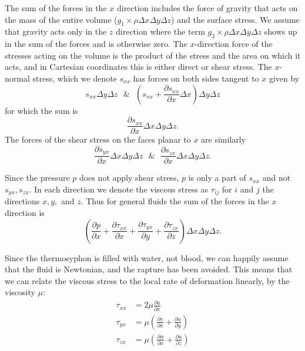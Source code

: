 The sum of the forces in the $x$ direction includes the force of gravity that acts on the mass of the entire volume ($g_1 \times \rho \Delta x\Delta y \Delta z$) and the surface stress.
We assume that gravity acts only in the $z$ direction where the term $g_3 \times \rho \Delta x \Delta y \Delta z$ shows up in the sum of the forces and is otherwise zero.
The $x$-direction force of the stresses acting on the volume is the product of the stress and the area on which it acts, and in Cartesian coordinates this is either direct or shear stress.
The $x$-normal stress, which we denote $s_{xx}$ has forces on both sides tangent to $x$ given by
\begin{equation*} s_{xx} \Delta y \Delta z ~~~\& ~~~ \left ( s_{xx} + \frac{\partial s_{xx} }{\partial x} \Delta x \right ) \Delta y \Delta z \end{equation*}
for which the sum is
\begin{equation*} \frac{\partial s_{xx} }{\partial x} \Delta x \Delta y \Delta z .\end{equation*}
The forces of the shear stress on the faces planar to $x$ are similarly
\begin{equation*} \frac{\partial s_{yx} }{\partial x} \Delta x \Delta y \Delta z ~~~\&~~~\frac{\partial s_{zx} }{\partial x} \Delta x \Delta y \Delta z .\end{equation*} 

Since the pressure $p$ does not apply shear stress, $p$ is only a part of $s_{xx}$ and not $s_{yx},s_{zx}$.
In each direction we denote the viscous stress as $\tau _{ij}$ for $i$ and $j$ the directions $x,y,$ and $z$.
Thus for general fluids the sum of the forces in the $x$ direction is
\begin{equation*} \left ( \frac{\partial p }{\partial x} + \frac{\partial \tau _{xx}}{\partial x} + \frac{\partial \tau _{yx}}{\partial y} + \frac{\partial \tau _{zx}}{\partial z} \right ) \Delta x \Delta y \Delta z . \end{equation*}

Since the thermosyphon is filled with water, not blood, we can happily assume that the fluid is Newtonian, and the rapture has been avoided.
This means that we can relate the viscous stress to the local rate of deformation linearly, by the viscosity $\mu$:
\begin{align*} \tau _{xx} &= 2 \mu \frac{\partial u}{\partial x} \\
\tau _{yx} &= \mu \left ( \frac{\partial v}{\partial x} + \frac{\partial u}{\partial y} \right )\\
\tau _{zx} &= \mu \left ( \frac{\partial w}{\partial x} + \frac{\partial u}{\partial z} \right )\end{align*}

